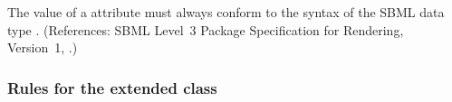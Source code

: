 {
The value of a  attribute must always conform to the
syntax of the SBML data type . (References: SBML Level~3
Package Specification for Rendering, Version~1,
.)
}

\subsubsection*{Rules for the extended  class}


